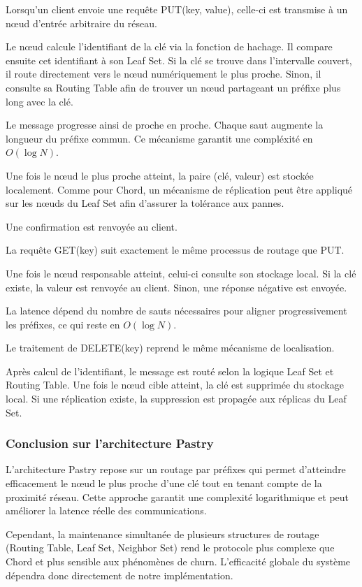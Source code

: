 Lorsqu'un client envoie une requ\^ete PUT(key, value), celle-ci est transmise \`a un n\oe ud d'entr\'ee arbitraire du r\'eseau.

Le n\oe ud calcule l'identifiant de la cl\'e via la fonction de hachage. Il compare ensuite cet identifiant \`a son Leaf Set. Si la cl\'e se trouve dans l'intervalle couvert, il route directement vers le n\oe ud num\'eriquement le plus proche. Sinon, il consulte sa Routing Table afin de trouver un n\oe ud partageant un pr\'efixe plus long avec la cl\'e.

Le message progresse ainsi de proche en proche. Chaque saut augmente la longueur du pr\'efixe commun. Ce m\'ecanisme garantit une compl\'exit\'e en $O(\log N)$.

Une fois le n\oe ud le plus proche atteint, la paire (cl\'e, valeur) est stock\'ee localement. 
Comme pour Chord, un m\'ecanisme de r\'eplication peut \^etre appliqu\'e sur les n\oe uds du Leaf Set afin d'assurer la tol\'erance aux pannes.

Une confirmation est renvoy\'ee au client.


La requ\^ete GET(key) suit exactement le m\^eme processus de routage que PUT.

Une fois le n\oe ud responsable atteint, celui-ci consulte son stockage local. Si la cl\'e existe, la valeur est renvoy\'ee au client. Sinon, une r\'eponse n\'egative est envoy\'ee.

La latence d\'epend du nombre de sauts n\'ecessaires pour aligner progressivement les pr\'efixes, ce qui reste en $O(\log N)$.


Le traitement de DELETE(key) reprend le m\^eme m\'ecanisme de localisation.

Apr\`es calcul de l'identifiant, le message est rout\'e selon la logique Leaf Set et Routing Table. Une fois le n\oe ud cible atteint, la cl\'e est supprim\'ee du stockage local. Si une r\'eplication existe, la suppression est propag\'ee aux r\'eplicas du Leaf Set.

\subsubsection{Conclusion sur l'architecture Pastry}

L'architecture Pastry repose sur un routage par pr\'efixes qui permet d'atteindre efficacement le n\oe ud le plus proche d'une cl\'e tout en tenant compte de la proximit\'e r\'eseau. Cette approche garantit une complexit\'e logarithmique et peut am\'eliorer la latence r\'eelle des communications.

Cependant, la maintenance simultan\'ee de plusieurs structures de routage (Routing Table, Leaf Set, Neighbor Set) rend le protocole plus complexe que Chord et plus sensible aux ph\'enom\`enes de churn. L'efficacit\'e globale du syst\`eme d\'ependra donc directement de notre impl\'ementation.


